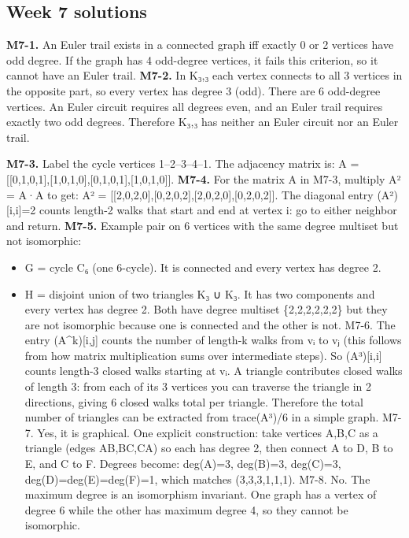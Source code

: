 \documentclass[11pt]{article}
\begin{document}
\subsection{Week 7 solutions}
\textbf{M7-1.} An Euler trail exists in a connected graph iff exactly 0 or 2 vertices have odd degree.
If the graph has 4 odd-degree vertices, it fails this criterion, so it cannot have an Euler trail.
\textbf{M7-2.} In K₃,₃ each vertex connects to all 3 vertices in the opposite part, so every vertex
has degree 3 (odd).
There are 6 odd-degree vertices. An Euler circuit requires all degrees even, and an Euler
trail requires exactly two odd degrees.
Therefore K₃,₃ has neither an Euler circuit nor an Euler trail.

\textbf{M7-3.} Label the cycle vertices 1–2–3–4–1. The adjacency matrix is:
A = [[0,1,0,1],[1,0,1,0],[0,1,0,1],[1,0,1,0]].
\textbf{M7-4.} For the matrix A in M7-3, multiply A² = A·A to get:
A² = [[2,0,2,0],[0,2,0,2],[2,0,2,0],[0,2,0,2]].
The diagonal entry (A²)[i,i]=2 counts length-2 walks that start and end at vertex i: go to
either neighbor and return.
\textbf{M7-5.} Example pair on 6 vertices with the same degree multiset but not isomorphic:
\begin{itemize}[leftmargin=*,itemsep=0.25em]
\item G = cycle C₆ (one 6-cycle). It is connected and every vertex has degree 2.
\item H = disjoint union of two triangles K₃ ∪ K₃. It has two components and every vertex has degree 2. Both have degree multiset \{2,2,2,2,2,2\} but they are not isomorphic because one is connected and the other is not. M7-6. The entry (A\textasciicircum{}k)[i,j] counts the number of length-k walks from vᵢ to vⱼ (this follows from how matrix multiplication sums over intermediate steps). So (A³)[i,i] counts length-3 closed walks starting at vᵢ. A triangle contributes closed walks of length 3: from each of its 3 vertices you can traverse the triangle in 2 directions, giving 6 closed walks total per triangle. Therefore the total number of triangles can be extracted from trace(A³)/6 in a simple graph. M7-7. Yes, it is graphical. One explicit construction: take vertices A,B,C as a triangle (edges AB,BC,CA) so each has degree 2, then connect A to D, B to E, and C to F. Degrees become: deg(A)=3, deg(B)=3, deg(C)=3, deg(D)=deg(E)=deg(F)=1, which matches (3,3,3,1,1,1). M7-8. No. The maximum degree is an isomorphism invariant. One graph has a vertex of degree 6 while the other has maximum degree 4, so they cannot be isomorphic.
\end{itemize}
\end{document}
